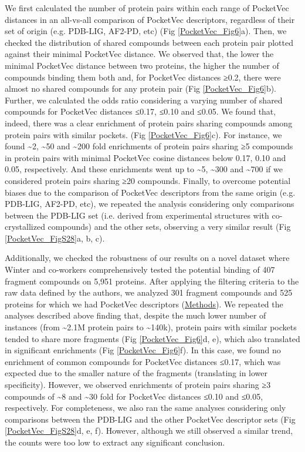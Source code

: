 We first calculated the number of protein pairs within each range of PocketVec distances in an all-vs-all comparison of PocketVec descriptors, regardless of their set of origin (e.g. PDB-LIG, AF2-PD, etc) (Fig \ref{PocketVec_Fig6}a). Then, we checked the distribution of shared compounds between each protein pair plotted against their minimal PocketVec distance. We observed that, the lower the minimal PocketVec distance between two proteins, the higher the number of compounds binding them both and, for PocketVec distances ≥0.2, there were almost no shared compounds for any protein pair (Fig \ref{PocketVec_Fig6}b). Further, we calculated the odds ratio considering a varying number of shared compounds for PocketVec distances ≤0.17, ≤0.10 and ≤0.05. We found that, indeed, there was a clear enrichment of protein pairs sharing compounds among protein pairs with similar pockets. (Fig \ref{PocketVec_Fig6}c). For instance, we found \textasciitilde2, \textasciitilde50 and \textasciitilde200 fold enrichments of protein pairs sharing ≥5 compounds in protein pairs with minimal PocketVec cosine distances below 0.17, 0.10 and 0.05, respectively. And these enrichments went up to \textasciitilde5, \textasciitilde300 and \textasciitilde700 if we considered protein pairs sharing ≥20 compounds. Finally, to overcome potential biases due to the comparison of PocketVec descriptors from the same origin (e.g. PDB-LIG, AF2-PD, etc), we repeated the analysis considering only comparisons between the PDB-LIG set (i.e. derived from experimental structures with co-crystallized compounds) and the other sets, observing a very similar result (Fig \ref{PocketVec_FigS28}a, b, c).

Additionally, we checked the robustness of our results on a novel dataset where Winter and co-workers comprehensively tested the potential binding of 407 fragment compounds on 5,951 proteins. After applying the filtering criteria to the raw data defined by the authors, we analyzed 301 fragment compounds and 525 proteins for which we had PocketVec descriptors (\hyperref[PocketVec_Methods]{Methods}). We repeated the analyses described above finding that, despite the much lower number of instances (from \textasciitilde2.1M protein pairs to \textasciitilde140k), protein pairs with similar pockets tended to share more fragments (Fig \ref{PocketVec_Fig6}d, e), which also translated in significant enrichments (Fig \ref{PocketVec_Fig6}f). In this case, we found no enrichment of common compounds for PocketVec distances ≤0.17, which was expected due to the smaller nature of the fragments (translating in lower specificity). However, we observed enrichments of protein pairs sharing ≥3 compounds of \textasciitilde8 and \textasciitilde30 fold for PocketVec distances ≤0.10 and ≤0.05, respectively. For completeness, we also ran the same analyses considering only comparisons between the PDB-LIG and the other PocketVec descriptor sets (Fig \ref{PocketVec_FigS28}d, e, f). However, although we still observed a similar trend, the counts were too low to extract any significant conclusion.

